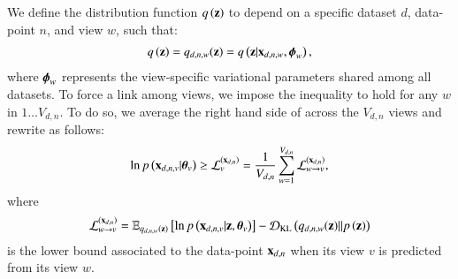 We define the distribution function $q\left(\mathbf{z}\right)$ to depend on a specific dataset $d$, data-point $n$, and view $w$, such that:
\begin{equation}\label{smeq:q}
\begin{aligned}
q\left(\mathbf{z}\right) = q_{d,n,w}(\mathbf{z}) = q\left(\mathbf{z}|\mathbf{x}_{d,n,w}, \boldsymbol{\phi}_w\right),
\end{aligned}
\end{equation}
where $\boldsymbol{\phi}_w$ represents the view-specific variational parameters shared among all datasets.
To force a link among views, we impose the inequality  to hold for any $w$ in $1 \ldots V_{d,n}$.
To do so, we average the right hand side of  across the $V_{d,n}$ views and rewrite  as follows:
\begin{equation}\label{smeq:newLB}
\begin{aligned}
\ln p\left(\mathbf{x}_{d,n,v}|\boldsymbol{\theta}_v\right) \geq \mathcal{L}_v^{(\mathbf{x}_{d,n})} = \frac{1}{V_{d,n}} \sum_{w=1}^{V_{d,n}} \mathcal{L}_{w \rightarrow v}^{(\mathbf{x}_{d,n})},
\end{aligned}
\end{equation}
where
\begin{equation}\label{smeq:LBdnvw}
\begin{aligned}
\mathcal{L}_{w \rightarrow v}^{(\mathbf{x}_{d,n})} = \operatorname{\mathbb{E}}_{q_{d,n,w}(\mathbf{z})}\left[\ln p\left(\mathbf{x}_{d,n,v}|\mathbf{z}, \boldsymbol{\theta}_v\right)\right] - \operatorname{\mathcal{D}_{KL}}\left(q_{d,n,w}(\mathbf{z})||p\left(\mathbf{z}\right)\right)
\end{aligned}
\end{equation}
is the lower bound associated to the data-point $\mathbf{x}_{d,n}$ when its view $v$ is predicted from its view $w$.

